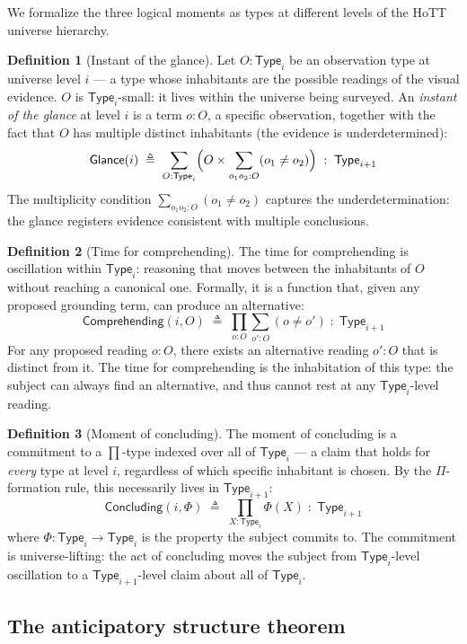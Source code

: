 \documentclass[12pt]{article}
\theoremstyle{definition}
\newtheorem{definition}{Definition}
\theoremstyle{remark}
\newcommand{\Type}[1]{\mathsf{Type}_{#1}}
\begin{document}
We formalize the three logical moments as types at different levels of the HoTT universe hierarchy.

\begin{definition}[Instant of the glance]
Let $O : \Type{i}$ be an observation type at universe level $i$ --- a type whose inhabitants are the possible readings of the visual evidence. $O$ is $\Type{i}$-small: it lives within the universe being surveyed. An \emph{instant of the glance} at level $i$ is a term $o : O$, a specific observation, together with the fact that $O$ has multiple distinct inhabitants (the evidence is underdetermined):
\[
\mathsf{Glance}(i) \;\triangleq\; \sum_{O:\Type{i}} \Bigl( O \times \sum_{o_1 o_2 : O} (o_1 \neq o_2) \Bigr) \;:\; \Type{i+1}
\]
The multiplicity condition $\sum_{o_1 o_2 : O} (o_1 \neq o_2)$ captures the underdetermination: the glance registers evidence consistent with multiple conclusions.
\end{definition}

\begin{definition}[Time for comprehending]
The time for comprehending is oscillation within $\Type{i}$: reasoning that moves between the inhabitants of $O$ without reaching a canonical one. Formally, it is a function that, given any proposed grounding term, can produce an alternative:
\[
\mathsf{Comprehending}(i, O) \;\triangleq\; \prod_{o:O} \sum_{o':O} (o \neq o') \;:\; \Type{i+1}
\]
For any proposed reading $o : O$, there exists an alternative reading $o' : O$ that is distinct from it. The time for comprehending is the inhabitation of this type: the subject can always find an alternative, and thus cannot rest at any $\Type{i}$-level reading.
\end{definition}

\begin{definition}[Moment of concluding]
The moment of concluding is a commitment to a $\prod$-type indexed over all of $\Type{i}$ --- a claim that holds for \emph{every} type at level $i$, regardless of which specific inhabitant is chosen. By the $\Pi$-formation rule, this necessarily lives in $\Type{i+1}$:
\[
\mathsf{Concluding}(i, \Phi) \;\triangleq\; \prod_{X:\Type{i}} \Phi(X) \;:\; \Type{i+1}
\]
where $\Phi : \Type{i} \to \Type{i}$ is the property the subject commits to. The commitment is universe-lifting: the act of concluding moves the subject from $\Type{i}$-level oscillation to a $\Type{i+1}$-level claim about all of $\Type{i}$.
\end{definition}

\subsection{The anticipatory structure theorem}
\end{document}
